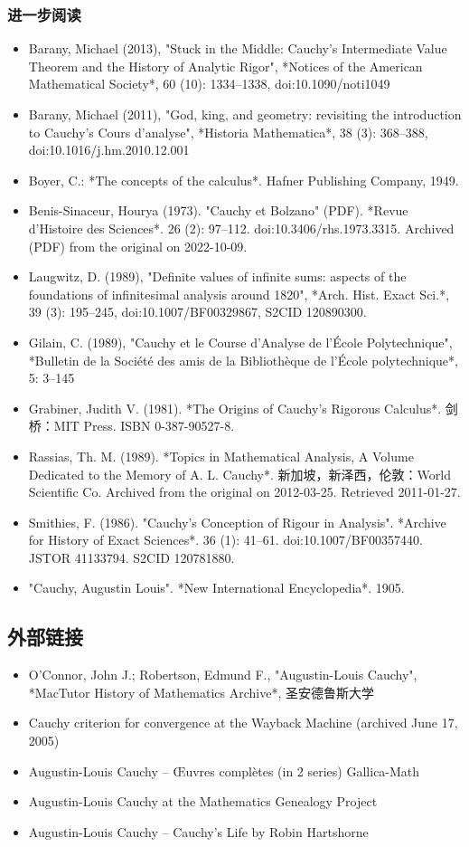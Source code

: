 \subsubsection{进一步阅读}
\begin{itemize}
\item Barany, Michael (2013), "Stuck in the Middle: Cauchy's Intermediate Value Theorem and the History of Analytic Rigor", *Notices of the American Mathematical Society*, 60 (10): 1334–1338, doi:10.1090/noti1049
\item Barany, Michael (2011), "God, king, and geometry: revisiting the introduction to Cauchy's Cours d'analyse", *Historia Mathematica*, 38 (3): 368–388, doi:10.1016/j.hm.2010.12.001
\item Boyer, C.: *The concepts of the calculus*. Hafner Publishing Company, 1949.
\item Benis-Sinaceur, Hourya (1973). "Cauchy et Bolzano" (PDF). *Revue d'Histoire des Sciences*. 26 (2): 97–112. doi:10.3406/rhs.1973.3315. Archived (PDF) from the original on 2022-10-09.
\item Laugwitz, D. (1989), "Definite values of infinite sums: aspects of the foundations of infinitesimal analysis around 1820", *Arch. Hist. Exact Sci.*, 39 (3): 195–245, doi:10.1007/BF00329867, S2CID 120890300.
\item Gilain, C. (1989), "Cauchy et le Course d'Analyse de l'École Polytechnique", *Bulletin de la Société des amis de la Bibliothèque de l'École polytechnique*, 5: 3–145
\item Grabiner, Judith V. (1981). *The Origins of Cauchy's Rigorous Calculus*. 剑桥：MIT Press. ISBN 0-387-90527-8.
\item Rassias, Th. M. (1989). *Topics in Mathematical Analysis, A Volume Dedicated to the Memory of A. L. Cauchy*. 新加坡，新泽西，伦敦：World Scientific Co. Archived from the original on 2012-03-25. Retrieved 2011-01-27.
\item Smithies, F. (1986). "Cauchy's Conception of Rigour in Analysis". *Archive for History of Exact Sciences*. 36 (1): 41–61. doi:10.1007/BF00357440. JSTOR 41133794. S2CID 120781880.
\item "Cauchy, Augustin Louis". *New International Encyclopedia*. 1905.  
\end{itemize}
\subsection{外部链接}
\begin{itemize}
\item O'Connor, John J.; Robertson, Edmund F., "Augustin-Louis Cauchy", *MacTutor History of Mathematics Archive*, 圣安德鲁斯大学
\item Cauchy criterion for convergence at the Wayback Machine (archived June 17, 2005)
\item Augustin-Louis Cauchy – Œuvres complètes (in 2 series) Gallica-Math
\item Augustin-Louis Cauchy at the Mathematics Genealogy Project
\item Augustin-Louis Cauchy – Cauchy's Life by Robin Hartshorne
\end{itemize}